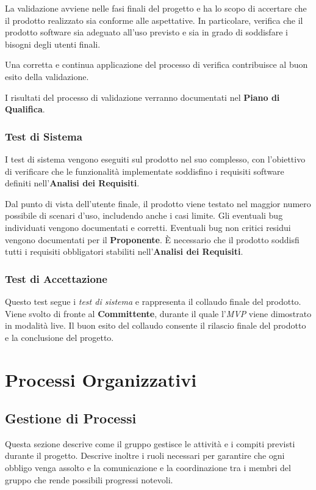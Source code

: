 \documentclass[12pt, a4paper]{article}
\begin{document}
La validazione avviene nelle fasi finali del progetto e ha lo scopo di accertare che il prodotto realizzato sia conforme alle aspettative. In particolare, verifica che il prodotto software sia adeguato all'uso previsto e sia in grado di soddisfare i bisogni degli utenti finali.

Una corretta e continua applicazione del processo di verifica contribuisce al buon esito della validazione.

I risultati del processo di validazione verranno documentati nel \textbf{Piano di Qualifica}.

\subsubsection{Test di Sistema}

I test di sistema vengono eseguiti sul prodotto nel suo complesso, con l'obiettivo di verificare che le funzionalità implementate soddisfino i requisiti software definiti nell'\textbf{Analisi dei Requisiti}.

Dal punto di vista dell'utente finale, il prodotto viene testato nel maggior numero possibile di scenari d'uso, includendo anche i casi limite. Gli eventuali bug individuati vengono documentati e corretti. Eventuali bug non critici residui vengono documentati per il \textbf{Proponente}. È necessario che il prodotto soddisfi tutti i requisiti obbligatori stabiliti nell'\textbf{Analisi dei Requisiti}.

\subsubsection{Test di Accettazione}

Questo test segue i \textit{test di sistema} e rappresenta il collaudo finale del prodotto. Viene svolto di fronte al \textbf{Committente}, durante il quale l'\textit{MVP} viene dimostrato in modalità live. Il buon esito del collaudo consente il rilascio finale del prodotto e la conclusione del progetto.

\newpage
\section{Processi Organizzativi}

\subsection{Gestione di Processi}

Questa sezione descrive come il gruppo gestisce le attività e i compiti previsti durante il progetto. Descrive inoltre i ruoli necessari per garantire che ogni obbligo venga assolto e la comunicazione e la coordinazione tra i membri del gruppo che rende possibili progressi notevoli.
\end{document}

